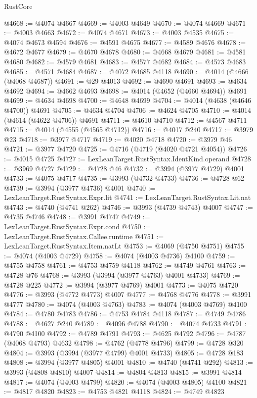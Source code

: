 \begin{lexlean}{RustCore}
\begin{coremodule}
@4668 := @4074 @4667
@4669 := @4003 @4649
@4670 := @4074 @4669
@4671 := @4003 @4663
@4672 := @4074 @4671
@4673 := @4003 @4535
@4675 := @4074 @4673 @4594
@4676 := @4591 @4675
@4677 := @4589 @4676
@4678 := @4672 @4677
@4679 := @4670 @4678
@4680 := @4668 @4679
@4681 := @4581 @4680
@4682 := @4579 @4681
@4683 := @4577 @4682
@4684 := @4573 @4683
@4685 := @4571 @4684
@4687 := @4072 @4685 @4118
@4690 := @4014 (@4666 (@4068 @4687))
@4691 := @29 @4013
@4692 := @4690 @4691
@4693 := @4634 @4692
@4694 := @4662 @4693
@4698 := @4014 (@4652 (@4660 @4694)) @4691
@4699 := @4634 @4698
@4700 := @4648 @4699
@4704 := @4014 (@4638 (@4646 @4700)) @4691
@4705 := @4634 @4704
@4706 := @4624 @4705
@4710 := @4014 (@4614 (@4622 @4706)) @4691
@4711 := @4610 @4710
@4712 := @4567 @4711
@4715 := @4014 (@4555 (@4565 @4712))
@4716 := @4017 @240
@4717 := @3979 @23
@4718 := @3977 @4717
@4719 := @4020 @4718
@4720 := @3979 @46
@4721 := @3977 @4720
@4725 := @4716 (@4719 (@4020 @4721 @4054))
@4726 := @4015 @4725
@4727 := LexLeanTarget.RustSyntax.IdentKind.operand
@4728 := @3969 @4727
@4729 := @4728 @46
@4732 := @3994 (@3977 @4729) @4001
@4733 := @4075 @4717
@4735 := @3993 (@4732 @4733)
@4736 := @4728 @62
@4739 := @3994 (@3977 @4736) @4001
@4740 := LexLeanTarget.RustSyntax.Expr.lit
@4741 := LexLeanTarget.RustSyntax.Lit.nat
@4743 := @4740 (@4741 @262)
@4746 := @3993 (@4739 @4743) @4007
@4747 := @4735 @4746
@4748 := @3991 @4747
@4749 := LexLeanTarget.RustSyntax.Expr.cond
@4750 := LexLeanTarget.RustSyntax.Callee.runtime
@4751 := LexLeanTarget.RustSyntax.Item.natLt
@4753 := @4069 (@4750 @4751)
@4755 := @4074 (@4003 @4729)
@4758 := @4074 (@4003 @4736) @4100
@4759 := @4755 @4758
@4761 := @4753 @4759 @4118
@4762 := @4749 @4761
@4763 := @4728 @76
@4768 := @3993 (@3994 (@3977 @4763) @4001 @4733)
@4769 := @4728 @225
@4772 := @3994 (@3977 @4769) @4001
@4773 := @4075 @4720
@4776 := @3993 (@4772 @4773) @4007
@4777 := @4768 @4776
@4778 := @3991 @4777
@4780 := @4074 (@4003 @4763)
@4783 := @4074 (@4003 @4769) @4100
@4784 := @4780 @4783
@4786 := @4753 @4784 @4118
@4787 := @4749 @4786
@4788 := @4627 @240
@4789 := @4096 @4788
@4790 := @4074 @4733
@4791 := @4790 @4100
@4792 := @4789 @4791
@4793 := @4625 @4792
@4796 := @4787 (@4068 @4793) @4632
@4798 := @4762 (@4778 @4796)
@4799 := @4728 @320
@4804 := @3993 (@3994 (@3977 @4799) @4001 @4733)
@4805 := @4728 @183
@4808 := @3994 (@3977 @4805) @4001
@4810 := @4740 (@4741 @292)
@4813 := @3993 (@4808 @4810) @4007
@4814 := @4804 @4813
@4815 := @3991 @4814
@4817 := @4074 (@4003 @4799)
@4820 := @4074 (@4003 @4805) @4100
@4821 := @4817 @4820
@4823 := @4753 @4821 @4118
@4824 := @4749 @4823

\end{coremodule}
\end{lexlean}
